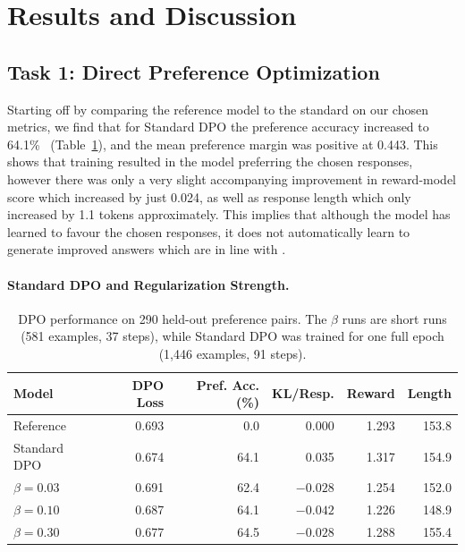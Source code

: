 \documentclass{article}
\newcommand{\tabsetup}{\footnotesize\setlength{\tabcolsep}{4pt}\renewcommand{\arraystretch}{0.95}}
\begin{document}

\section{Results and Discussion}
\label{sec:results}


\subsection{Task 1: Direct Preference Optimization}
\label{subsec:results-task1}
 Starting off by comparing the reference model to the standard on our chosen metrics, we find that for Standard DPO the preference accuracy increased to 64.1\% ~(Table~\ref{tab:dpo_main}), and the mean preference margin was positive at 0.443. This shows that training resulted in the model preferring the chosen responses, however there was only a very slight accompanying improvement in reward-model score which increased by just 0.024, as well as response length which only increased by 1.1 tokens approximately. This implies that although the model has learned to favour the chosen responses, it does not automatically learn to generate improved answers which are in line with \citep{tang2024gap}.

\paragraph{Standard DPO and Regularization Strength.}\label{subsubsec:results-t1-beta}
\begin{table}[t]
\centering
\caption{DPO performance on 290 held-out preference pairs. The $\beta$ runs are short runs (581 examples, 37 steps), while Standard DPO was trained for one full epoch (1,446 examples, 91 steps).}
\label{tab:dpo_main}
\tabsetup
\begin{tabular}{lrrrrr}
\toprule
Model & DPO Loss & Pref. Acc. (\%) &
KL/Resp. & Reward & Length \\
\midrule
Reference      & 0.693 & 0.0 & 0.000 & 1.293 & 153.8 \\
Standard DPO   & 0.674 & 64.1 & 0.035 & 1.317 & 154.9 \\
\midrule
$\beta=0.03$  & 0.691 & 62.4 & $-0.028$ & 1.254 & 152.0 \\
$\beta=0.10$  & 0.687 & 64.1 & $-0.042$ & 1.226 & 148.9 \\
$\beta=0.30$  & 0.677 & 64.5 & $-0.028$ & 1.288 & 155.4 \\
\bottomrule
\end{tabular}
\vspace{2pt}

\end{table}
\end{document}
